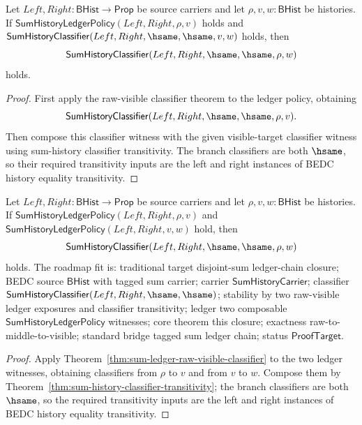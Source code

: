 \begin{theorem}
\label{thm:sum-ledger-classifier-extension}
Let $Left,Right:\mathsf{BHist}\to\mathsf{Prop}$ be source carriers and let
$\rho,v,w:\mathsf{BHist}$ be histories. If
$\mathsf{SumHistoryLedgerPolicy}(Left,Right,\rho,v)$ holds and
$\mathsf{SumHistoryClassifier}(Left,Right,\hsame,\hsame,v,w)$ holds, then
$$
\mathsf{SumHistoryClassifier}(Left,Right,\hsame,\hsame,\rho,w)
$$
holds.
\end{theorem}
\begin{proof}
First apply the raw-visible classifier theorem to the ledger policy, obtaining
$$
\mathsf{SumHistoryClassifier}(Left,Right,\hsame,\hsame,\rho,v).
$$
Then compose this classifier witness with the given visible-target classifier
witness using sum-history classifier transitivity. The branch classifiers are
both $\hsame$, so their required transitivity inputs are the left and right
instances of BEDC history equality transitivity.
\end{proof}

\begin{theorem}
\label{thm:sum-ledger-two-step-classifier-composition}
Let $Left,Right:\mathsf{BHist}\to\mathsf{Prop}$ be source carriers and let
$\rho,v,w:\mathsf{BHist}$ be histories. If
$\mathsf{SumHistoryLedgerPolicy}(Left,Right,\rho,v)$ and
$\mathsf{SumHistoryLedgerPolicy}(Left,Right,v,w)$ hold, then
$$
\mathsf{SumHistoryClassifier}(Left,Right,\hsame,\hsame,\rho,w)
$$
holds. The roadmap fit is: traditional target disjoint-sum ledger-chain
closure; BEDC source $\mathsf{BHist}$ with tagged sum carrier; carrier
$\mathsf{SumHistoryCarrier}$; classifier
$\mathsf{SumHistoryClassifier}(Left,Right,\hsame,\hsame)$; stability by two
raw-visible ledger exposures and classifier transitivity; ledger two
composable $\mathsf{SumHistoryLedgerPolicy}$ witnesses; core theorem this
closure; exactness raw-to-middle-to-visible; standard bridge tagged sum ledger
chain; status $\mathsf{ProofTarget}$.
\end{theorem}
\begin{proof}
Apply Theorem~\ref{thm:sum-ledger-raw-visible-classifier} to the two ledger
witnesses, obtaining classifiers from $\rho$ to $v$ and from $v$ to $w$.
Compose them by Theorem~\ref{thm:sum-history-classifier-transitivity}; the
branch classifiers are both $\hsame$, so the required transitivity inputs are
the left and right instances of BEDC history equality transitivity.
\end{proof}

